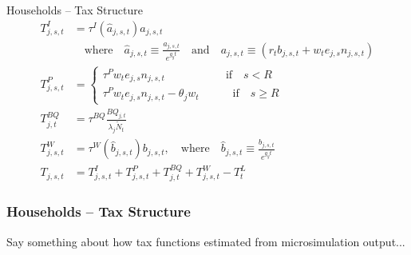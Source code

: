 \documentclass{beamer}
\begin{document}
  \begin{frame}{Households -- Tax Structure}
    \begin{align}
      T^I_{j,s,t} & = \tau^I(\hat{a}_{j,s,t})a_{j,s,t} \nonumber \\
      & \quad\text{where}\quad \hat{a}_{j,s,t}\equiv\frac{a_{j,s,t}}{e^{g_y t}} \quad\text{and}\quad a_{j,s,t} \equiv (r_t b_{j,s,t} + w_t e_{j,s}n_{j,s,t}) \nonumber \\
      T^P_{j,s,t} & =
        \begin{cases}
          \tau^P w_t e_{j,s}n_{j,s,t} \quad\quad\quad\quad\quad\:\:\text{if}\quad s<R \\
          \tau^P w_t e_{j,s}n_{j,s,t} - \theta_j w_t \quad\quad\quad\text{if}\quad s\geq R
        \end{cases}  \nonumber \\
      T^{BQ}_{j,t} & = \tau^{BQ} \frac{BQ_{j,t}}{\lambda_j\tilde{N}_t}  \nonumber \\
      T^W_{j,s,t} & = \tau^W(\hat b_{j,s,t}) b_{j,s,t},\quad\text{where}\quad \hat{b}_{j,s,t}\equiv\frac{b_{j,s,t}}{e^{g_y t}}  \nonumber \\
      T_{j,s,t} & = T^I_{j,s,t} + T^P_{j,s,t} + T^{BQ}_{j,t} + T^W_{j,s,t} - T^L_{t} \nonumber
    \end{align}
  \end{frame}
  
    \begin{frame}
    \frametitle{Households -- Tax Structure}
      Say something about how tax functions estimated from microsimulation output...
  \end{frame}
\end{document}

